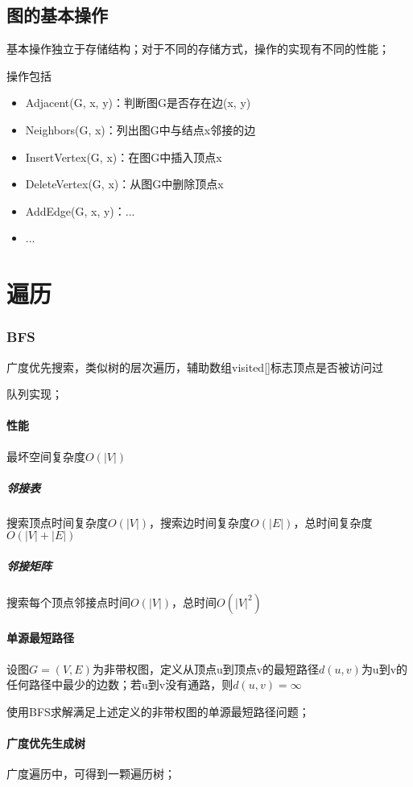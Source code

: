 \subsection{图的基本操作}
基本操作独立于存储结构；对于不同的存储方式，操作的实现有不同的性能；

操作包括\begin{itemize}
    \item Adjacent(G, x, y)：判断图G是否存在边(x, y)
    \item Neighbors(G, x)：列出图G中与结点x邻接的边
    \item InsertVertex(G, x)：在图G中插入顶点x
    \item DeleteVertex(G, x)：从图G中删除顶点x
    \item AddEdge(G, x, y)：...
    \item ...
\end{itemize}

\section{遍历}

\subsubsection{BFS}
广度优先搜索，类似树的层次遍历，辅助数组visited[]标志顶点是否被访问过

队列实现；

\paragraph{性能}
最坏空间复杂度\(O(|V|)\)

\subparagraph{邻接表}
搜索顶点时间复杂度\(O(|V|)\)，搜索边时间复杂度\(O(|E|)\)，总时间复杂度\(O(|V| + |E|)\)

\subparagraph{邻接矩阵}
搜索每个顶点邻接点时间\(O(|V|)\)，总时间\(O(|V|^2)\)

\paragraph{单源最短路径}
设图\(G = (V, E)\)为非带权图，定义从顶点u到顶点v的最短路径\(d(u, v)\)为u到v的任何路径中最少的边数；若u到v没有通路，则\(d(u, v) = \infty\)

使用BFS求解满足上述定义的非带权图的单源最短路径问题；

\paragraph{广度优先生成树}
广度遍历中，可得到一颗遍历树；

